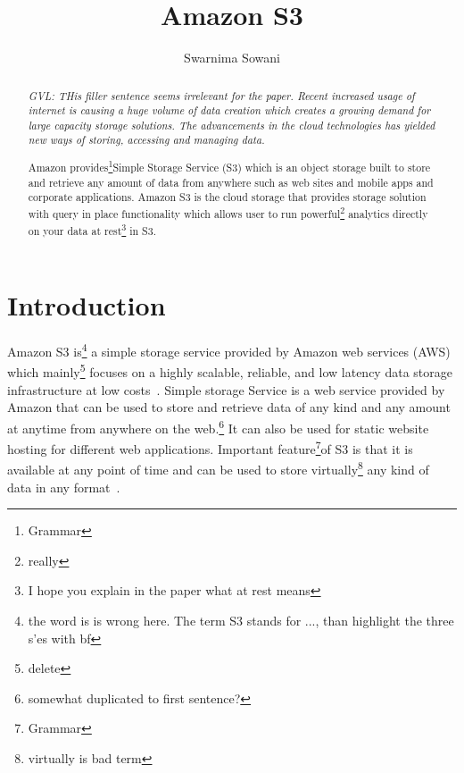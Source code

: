 
\title{Amazon S3}


\author{Swarnima Sowani}

\newcommand{\GE}{\footnote{Grammar}}
\newcommand{\GVL}[1]{\footnote{#1}}
\renewcommand{\shortauthors}{G. v. Laszewski}

\begin{abstract}

  \emph{GVL: THis filler sentence seems irrelevant for the paper.
    Recent increased usage of internet is causing a huge volume of
    data creation which creates a growing demand for large capacity
    storage solutions. The advancements in the cloud technologies has
    yielded new ways of storing, accessing and managing data.}

Amazon provides\GE Simple Storage Service (S3) 
which is an object storage built to store and retrieve any amount
of data from anywhere such as web sites and mobile apps and corporate
applications. Amazon S3 is the cloud storage that provides storage solution
with query in place functionality which allows user to run powerful\GVL{really} analytics
directly on your data at rest\GVL{I hope you explain in the paper what
at rest means} in S3.

\end{abstract}


\maketitle

\section{Introduction}

Amazon S3 is\GVL{the word is is wrong here. The term S3 stands for
  ..., than highlight the three s'es with bf} a simple storage service
provided by Amazon web services (AWS) which mainly\GVL{delete} focuses
on a highly scalable, reliable, and low latency data storage
infrastructure at low costs~\cite{hid-sp18-420-amazon-S3-FAQ}. Simple
storage Service is a web service provided by Amazon that can be used
to store and retrieve data of any kind and any amount at anytime from
anywhere on the web.\GVL{somewhat duplicated to first sentence?} It
can also be used for static website hosting for different web
applications. Important feature\GE of S3 is that it is available at
any point of time and can be used to store virtually\GVL{virtually is
  bad term} any kind of data in any
format~\cite{hid-sp18-420-amazon-S3-FAQ}.

